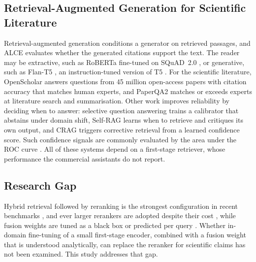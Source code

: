 \subsection{Retrieval-Augmented Generation for Scientific Literature}
\label{sec:lit-rag}

Retrieval-augmented generation \parencite{lewis2020rag} conditions a generator on retrieved
passages, and ALCE \parencite{gao2023enabling} evaluates whether the generated citations support
the text. The reader may be extractive, such as RoBERTa \parencite{liu2019roberta} fine-tuned on
SQuAD~2.0 \parencite{rajpurkar2018squad2}, or generative, such as Flan-T5
\parencite{chung2024flan}, an instruction-tuned version of T5 \parencite{raffel2020t5}. For the
scientific literature, OpenScholar \parencite{asai2026openscholar} answers questions from 45
million open-access papers with citation accuracy that matches human experts, and PaperQA2
\parencite{skarlinski2024paperqa} matches or exceeds experts at literature search and
summarisation. Other work improves reliability by deciding when to answer: selective question
answering \parencite{kamath2020selective} trains a calibrator that abstains under domain shift,
Self-RAG \parencite{asai2024selfrag} learns when to retrieve and critiques its own output, and
CRAG \parencite{yan2024crag} triggers corrective retrieval from a learned confidence score. Such
confidence signals are commonly evaluated by the area under the ROC curve
\parencite{hanley1982auc}. All of these systems depend on a first-stage retriever, whose
performance the commercial assistants do not report.

\subsection{Research Gap}
\label{sec:gap}

Hybrid retrieval followed by reranking is the strongest configuration in recent benchmarks
\parencite{akarsu2026bm25}, and ever larger rerankers are adopted despite their cost
\parencite{sun2023rankgpt,schlatt2025rankdistillm}, while fusion weights are tuned as a black box
\parencite{bruch2024fusion} or predicted per query \parencite{hsu2025dat}. Whether in-domain
fine-tuning of a small first-stage encoder, combined with a fusion weight that is understood
analytically, can replace the reranker for scientific claims has not been examined. This study
addresses that gap.
